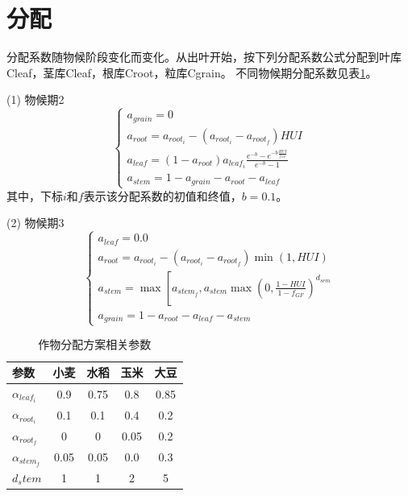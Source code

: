 \section{分配}
分配系数随物候阶段变化而变化。从出叶开始，按下列分配系数公式分配到叶库Cleaf，茎库Cleaf，根库Croot，粒库Cgrain。
不同物候期分配系数见表\ref{tab:作物分配方案相关参数}。

(1)	物候期2 \\
\begin{equation}
\left\{\begin{array}{c}
  a_{grain}=0 \\ 
  a_{root}=a_{root_i}-\left(a_{root_i}-a_{root_f}\right) HUI \\
  a_{leaf}=\left(1-a_{root}\right) a_{leaf_i} \frac{{e}^{-{b}}-{e}^{-b \frac{H U I}{f_{GF}}}}{{e}^{-{b}}-1}   \\
  a_{stem}=1-a_{ {grain }}-a_{ {root }}-a_{ {leaf }}\end{array}\right.
\end{equation}
其中，下标$i$和$f$表示该分配系数的初值和终值，$b=0.1$。

(2)	物候期3 \\
\begin{equation}
  \left\{\begin{array}{c}
    a_{leaf}=0.0 \\ 
    a_{root}=a_{root_i}-\left(a_{root_i}-a_{root_f}\right) \min(1, HUI) \\
    a_{stem}=\max \left[a_{stem_f}, a_{stem} \max \left(0, \frac{1-HUI}{1-f_{GF}}\right)^{d_{sem}}\right. \\
    a_{grain}=1-a_{root}-a_{leaf}-a_{stem}\end{array}\right.
\end{equation}
\begin{table}[]
  \centering
  \caption{作物分配方案相关参数}
  \label{tab:作物分配方案相关参数}
\begin{tabular}{@{}lcccc@{}}
  \toprule
参数       & 小麦   & 水稻   & 玉米   & 大豆   \\ \midrule
$\alpha_{leaf_i}$ & 0.9  & 0.75 & 0.8  & 0.85 \\
$\alpha_{root_i}$ & 0.1  & 0.1  & 0.4  & 0.2  \\
$\alpha_{root_f}$ & 0    & 0    & 0.05 & 0.2  \\
$\alpha_{stem_f}$ & 0.05 & 0.05 & 0.0  & 0.3  \\
$d_stem$    & 1    & 1    & 2    & 5   \\\bottomrule
\end{tabular}
\end{table}
